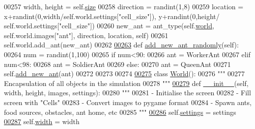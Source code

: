 \begin{DoxyCode}
00257         width, height = self.\hyperlink{classdisplay_1_1Entity_aa56fd9b8bb6c9510f24ea13be8c6a218}{size}
00258         direction = randint(1,8)
00259         location = x+randint(0,width/self.world.settings[\textcolor{stringliteral}{"cell\_size"}]), y+randint(0,height/
      self.world.settings[\textcolor{stringliteral}{"cell\_size"}])
00260         new\_ant = ant\_type(self.\hyperlink{classdisplay_1_1Entity_ad7e3284bfb984c309b35d5a077bd5b21}{world}, self.world.images[\textcolor{stringliteral}{"ant"}], direction, location, self)
00261         self.world.add\_ant(new\_ant)
00262 
\hypertarget{world_8py_source_l00263}{}\hyperlink{classworld_1_1Nest_ac845bc370bbb778a45a360145a48be61}{00263}     \textcolor{keyword}{def }\hyperlink{classworld_1_1Nest_ac845bc370bbb778a45a360145a48be61}{add\_new\_ant\_randomly}(self):
00264         num = randint(1,100)
00265         \textcolor{keywordflow}{if} num<90:
00266             ant = WorkerAnt
00267         \textcolor{keywordflow}{elif} num<98:
00268             ant = SoldierAnt
00269         \textcolor{keywordflow}{else}:
00270             ant = QueenAnt
00271         self.\hyperlink{classworld_1_1Nest_a0b76a02840f15fe7909859d523736a58}{add\_new\_ant}(ant)
00272         
00273         
00274 
\hypertarget{world_8py_source_l00275}{}\hyperlink{classworld_1_1World}{00275} \textcolor{keyword}{class }\hyperlink{classworld_1_1World}{World}():
00276     \textcolor{stringliteral}{"""}
00277 \textcolor{stringliteral}{    Encapsulation of all objects in the simulation}
00278 \textcolor{stringliteral}{    """}
\hypertarget{world_8py_source_l00279}{}\hyperlink{classworld_1_1World_a4351253668240be9d3a0d5bc2f1aa18f}{00279}     \textcolor{keyword}{def }\hyperlink{classworld_1_1World_a4351253668240be9d3a0d5bc2f1aa18f}{\_\_init\_\_}(self, width, height, images, settings):
00280         \textcolor{stringliteral}{"""}
00281 \textcolor{stringliteral}{        - Initialise the screen}
00282 \textcolor{stringliteral}{        - Fill screen with "Cells"}
00283 \textcolor{stringliteral}{        - Convert images to pygame format}
00284 \textcolor{stringliteral}{        - Spawn ants, food sources, obstacles, ant home, etc}
00285 \textcolor{stringliteral}{        """}
\hypertarget{world_8py_source_l00286}{}\hyperlink{classworld_1_1World_a41e0f9d00bb365408abee5a084bdce24}{00286}         self.\hyperlink{classworld_1_1World_a41e0f9d00bb365408abee5a084bdce24}{settings} = settings
\hypertarget{world_8py_source_l00287}{}\hyperlink{classworld_1_1World_a5ace9de2d4cd40bbb013db9712f4ef34}{00287}         self.\hyperlink{classworld_1_1World_a5ace9de2d4cd40bbb013db9712f4ef34}{width} = width

\end{DoxyCode}
